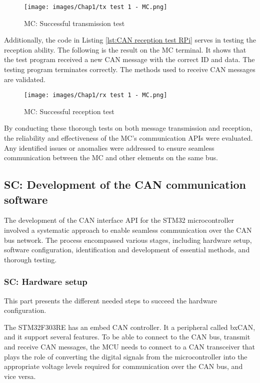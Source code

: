 \begin{figure}[H]
\begin{center}
\texttt{[image: images/Chap1/tx test 1 - MC.png]}\\
\caption{MC: Successful transmission test}
\label{MC tx test}
\end{center}
\end{figure}

Additionally, the code in Listing \ref{lst:CAN reception test RPi} serves in testing the reception ability. The following is the result on the MC terminal. It shows that the test program received a new CAN message with the correct ID and data. The testing program terminates correctly. The methods used to receive CAN messages are validated.

\begin{figure}[H]
\begin{center}
\texttt{[image: images/Chap1/rx test 1 - MC.png]}\\
\caption{MC: Successful reception test}
\label{MC rx test}
\end{center}
\end{figure}

By conducting these thorough tests on both message transmission and reception, the reliability and effectiveness of the MC's communication APIs were evaluated. Any identified issues or anomalies were addressed to ensure seamless communication between the MC and other elements on the same bus.

\subsection{SC: Development of the CAN communication software}

The development of the CAN interface API for the STM32 microcontroller involved a systematic approach to enable seamless communication over the CAN bus network. The process encompassed various stages, including hardware setup, software configuration, identification and development of essential methods, and thorough testing.

\subsubsection{SC: Hardware setup}
This part presents the different needed steps to succeed the hardware configuration.

The STM32F303RE has an embed CAN controller. It a peripheral called bxCAN, and it support several features.
To be able to connect to the CAN bus, transmit and receive CAN messages, the MCU needs to connect to a CAN transceiver that plays the role of converting the digital signals from the microcontroller into the appropriate voltage levels required for communication over the CAN bus, and vice versa.

